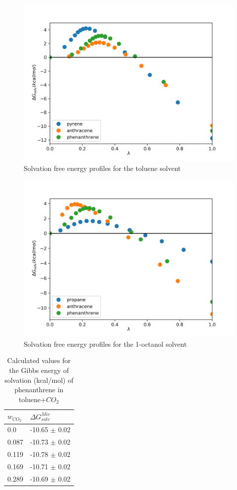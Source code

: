 \begin{figure}
	\centering
    \includegraphics[width=0.9\linewidth]{Figures/tol}
    \caption{Solvation free energy profiles for the toluene solvent }
    \label{fig:tol}
\end{figure}

\begin{figure}
\centering
\includegraphics[width=0.9\linewidth]{Figures/oct}
\caption{Solvation free energy profiles for the 1-octanol solvent}
\label{fig:oct}
\end{figure}



\FloatBarrier
\begin{table}[h]
\centering
  \caption{Calculated values for the Gibbs energy of solvation (kcal/mol) of phenanthrene in toluene+$CO_{2}$}
  \label{tbl:solv3}
  \begin{tabular}{ll}
    \hline
      $w_{CO_{2}}$ & $\Delta G_{solv}^{Mie}$ \\
    \hline
    0.0    & -10.65 $\pm$ 0.02   \\
    0.087  & -10.73 $\pm$ 0.02   \\
    0.119  & -10.78 $\pm$ 0.02   \\
    0.169  & -10.71 $\pm$ 0.02   \\
    0.289  & -10.69 $\pm$ 0.02   \\
    \hline
  \end{tabular}
\end{table}
\FloatBarrier

